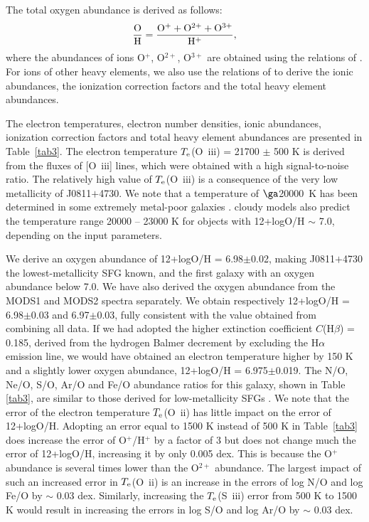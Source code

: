 \documentclass[useAMS,usenatbib]{mn2e}
\begin{document}
The total oxygen abundance is derived as follows:
\begin{equation}
\frac{\rm O}{\rm H} = \frac{{\rm O}^++{\rm O}^{2+}+{\rm O}^{3+}}{{\rm H}^+}, 
\label{OH} 
\end{equation}
where the abundances of ions O$^+$, O$^{2+}$, O$^{3+}$ are obtained using 
the relations of \citet{I06}. For ions of other heavy elements, we also use
the relations of \citet{I06} to derive the ionic abundances, the ionization
correction factors and the total heavy element abundances.

The electron temperatures, electron number densities, ionic abundances,
ionization correction factors and total heavy element abundances are presented 
in Table~\ref{tab3}. The electron temperature $T_{\rm e}$(O~{\sc iii})
= 21700 $\pm$ 500 K is derived from the fluxes of [O~{\sc iii}] lines, 
which were obtained with a high signal-to-noise ratio. The relatively high value of 
$T_{\rm e}$(O~{\sc iii}) is a consequence of the very low metallicity of J0811$+$4730.
We note that a temperature of $\ga$20000~K has been determined 
in some extremely metal-poor galaxies \citep[e.g. ][]{I09}. {\sc cloudy} 
models also predict the temperature range 20000 -- 23000 K
for objects with 12+logO/H $\sim$ 7.0, depending on the input parameters.

We derive an oxygen abundance of
12+logO/H = 6.98$\pm$0.02, making J0811$+$4730 the lowest-metallicity
SFG known, and the first galaxy with an oxygen abundance below 7.0.
We have also derived the oxygen abundance from the MODS1 and MODS2 spectra 
separately. We obtain respectively 12+logO/H = 6.98$\pm$0.03 and  6.97$\pm$0.03,
fully consistent with the value obtained from combining all data.
If we had adopted the higher extinction coefficient $C$(H$\beta$) = 0.185,  
derived from the hydrogen Balmer decrement by excluding the H$\alpha$ emission line, 
we would have obtained an electron temperature higher by 150 K  and a  slightly lower
oxygen abundance, 12+logO/H = 6.975$\pm$0.019. 
The N/O, Ne/O, S/O, Ar/O and Fe/O abundance ratios 
for this galaxy, shown in Table \ref{tab3}, are similar to those 
derived for low-metallicity SFGs \citep[e.g., ][]{I06}.
We note that the error of the electron temperature 
$T_{\rm e}$(O~{\sc ii}) has little impact on the error of 12+logO/H.
Adopting an error equal to 1500 K instead of 500 K in Table~\ref{tab3} does 
increase the error of O$^+$/H$^+$ by a factor of 3 but does not change much the 
error of 12+logO/H, increasing it by only 0.005 dex. This is because the O$^+$
abundance is several times lower than the O$^{2+}$ abundance. The largest impact
of such an increased error in  $T_{\rm e}$(O~{\sc ii}) is an increase in the errors of log N/O and 
log Fe/O by $\sim$ 0.03 dex. Similarly, increasing the $T_{\rm e}$(S~{\sc iii}) error from
500 K to 1500 K would result in increasing the errors in log S/O and log Ar/O 
by $\sim$ 0.03 dex.
\end{document}
